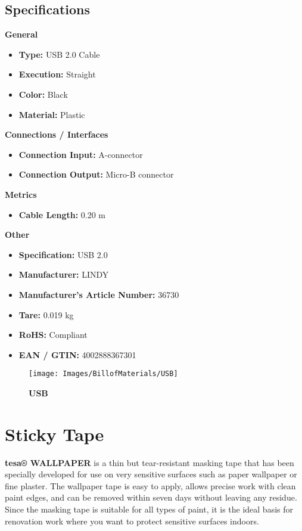 \subsection{Specifications}
\textbf{General}
\begin{itemize}[noitemsep]
	\item \textbf{Type:} USB 2.0 Cable
	\item \textbf{Execution:} Straight
	\item \textbf{Color:} Black
	\item \textbf{Material:} Plastic
\end{itemize}

\textbf{Connections / Interfaces}
\begin{itemize}[noitemsep]
	\item \textbf{Connection Input:} A-connector
	\item \textbf{Connection Output:} Micro-B connector
\end{itemize}

\textbf{Metrics}
\begin{itemize}[noitemsep]
	\item \textbf{Cable Length:} 0.20 m
\end{itemize}

\textbf{Other}
\begin{itemize}[noitemsep]
	\item \textbf{Specification:} USB 2.0
	\item \textbf{Manufacturer:} LINDY
	\item \textbf{Manufacturer's Article Number:} 36730
	\item \textbf{Tare:} 0.019 kg
	\item \textbf{RoHS:} Compliant
	\item \textbf{EAN / GTIN:} 4002888367301
\end{itemize}

\begin{figure}[h!]\centering
	\texttt{[image: Images/BillofMaterials/USB]}
	\caption{\textbf{USB}}
	\label{fig:USB}
\end{figure}

\section{Sticky Tape}

\textbf{tesa® WALLPAPER} is a thin but tear-resistant masking tape that has been specially developed for use on very sensitive surfaces such as paper wallpaper or fine plaster. The wallpaper tape is easy to apply, allows precise work with clean paint edges, and can be removed within seven days without leaving any residue. Since the masking tape is suitable for all types of paint, it is the ideal basis for renovation work where you want to protect sensitive surfaces indoors.

